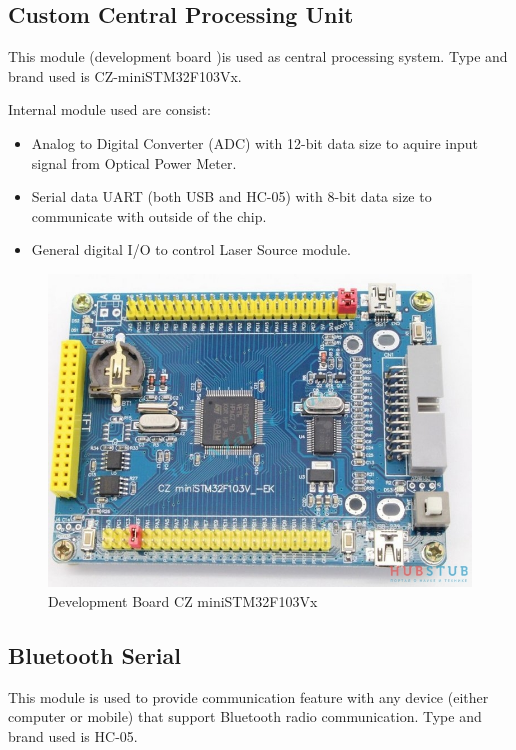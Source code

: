 \documentclass[12pt,]{book}
\begin{document}
	\subsection{Custom Central Processing Unit}
	This module (development board )is used as central processing system.
	Type and brand used is CZ-miniSTM32F103Vx.
	
	Internal module used are consist:
	\begin{itemize}
		\item Analog to Digital Converter (ADC) with 12-bit data size to aquire input signal from Optical Power Meter.
		\item Serial data UART (both USB and HC-05) with 8-bit data size to communicate with outside of the chip.
		\item General digital I/O to control Laser Source module.
	\end{itemize}

	\begin{figure}[h]
		\centering
		\includegraphics[width=400pt]{images/ministm32f103}
		\caption{Development Board CZ miniSTM32F103Vx}
	\end{figure}

	\newpage
	\subsection{Bluetooth Serial}
	This module is used to provide communication feature with any device (either computer or mobile) that support Bluetooth radio communication. 
	Type and brand used is HC-05.
	
\end{document}
